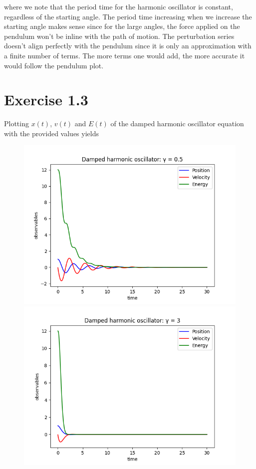 \documentclass[a4paper,12pt]{article}
\begin{document}
\FloatBarrier

where we note that the period time for the harmonic oscillator is constant, regardless of the starting angle.
The period time increasing when we increase the starting angle makes sense since for the large angles, the force
applied on the pendulum won't be inline with the path of motion. The perturbation series doesn't align perfectly
with the pendulum since it is only an approximation with a finite number of terms. The more terms one would add,
the more accurate it would follow the pendulum plot.

\section*{Exercise 1.3}

Plotting $x(t)$, $v(t)$ and $E(t)$ of the damped harmonic oscillator equation with the provided values yields

\begin{figure}[!ht]
  \centering
  \begin{minipage}{0.45\textwidth}
    \includegraphics[width=\textwidth]{img/3-gamma-low.png}
  \end{minipage}%
  \begin{minipage}{0.45\textwidth}
    \includegraphics[width=\textwidth]{img/3-gamma-high.png}
  \end{minipage} 
\end{figure}
\end{document}
